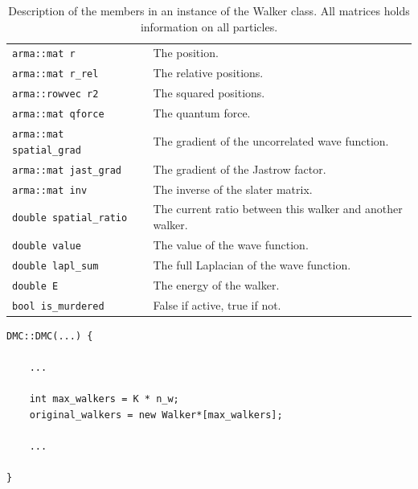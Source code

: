 \begin{table}
\label{tab:walkerClassMembers}
\begin{center}

\caption{Description of the members in an instance of the Walker class. All matrices holds information on all particles.}

 \begin{tabular}{|l| c l|}
 \hline
 \verb+arma::mat r+           &  & The position.\\
 \verb+arma::mat r_rel+       &  & The relative positions.\\
 \verb+arma::rowvec r2+       &  & The squared positions. \\
 \verb+arma::mat qforce+      &  & The quantum force.\\
 \verb+arma::mat spatial_grad+&  & The gradient of the uncorrelated wave function.\\
 \verb+arma::mat jast_grad+   &  & The gradient of the Jastrow factor.\\
 \verb+arma::mat inv+         &  & The inverse of the slater matrix.\\
 \verb+double spatial_ratio+  &  & The current ratio between this walker and another walker.\\
 \verb+double value+          &  & The value of the wave function.\\
 \verb+double lapl_sum+       &  & The full Laplacian of the wave function.\\
 \verb+double E+              &  & The energy of the walker. \\
 \verb+bool is_murdered+      &  & False if active, true if not. \\
 \hline 
 \end{tabular}
 
 
\end{center}
\end{table}


\vspace{0.5 cm}
\begin{lstlisting}
DMC::DMC(...) {

    ...
 
    int max_walkers = K * n_w;
    original_walkers = new Walker*[max_walkers];
    
    ...

}
\end{lstlisting}


